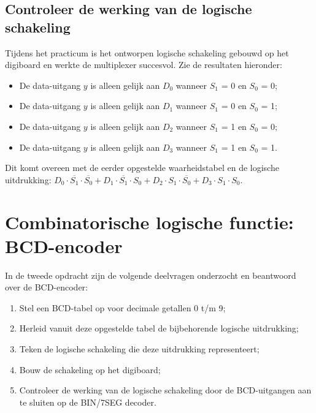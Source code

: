 \documentclass[12pt]{article}
\begin{document}
\subsection{Controleer de werking van de logische schakeling}
Tijdens het practicum is het ontworpen logische schakeling gebouwd op het digiboard en werkte de multiplexer succesvol. 
Zie de resultaten hieronder: 
\begin{itemize}
    \item De data-uitgang $y$ is alleen gelijk aan $D_0$ wanneer $S_1$ = 0 en $S_0$ = 0;
    \item De data-uitgang $y$ is alleen gelijk aan $D_1$ wanneer $S_1$ = 0 en $S_0$ = 1;
    \item De data-uitgang $y$ is alleen gelijk aan $D_2$ wanneer $S_1$ = 1 en $S_0$ = 0;
    \item De data-uitgang $y$ is alleen gelijk aan $D_3$ wanneer $S_1$ = 1 en $S_0$ = 1.
\end{itemize}
Dit komt overeen met de eerder opgestelde waarheidstabel en de logische uitdrukking: $D_0 \cdot \overline{S_1} \cdot \overline{S_0} + D_1 \cdot \overline{S_1} \cdot S_0 + D_2 \cdot S_1 \cdot \overline{S_0} + D_3 \cdot S_1 \cdot S_0$.
\pagebreak
\section{Combinatorische logische functie: BCD-encoder}
In de tweede opdracht zijn de volgende deelvragen onderzocht en beantwoord over de BCD-encoder:
\begin{enumerate}
    \item Stel een BCD-tabel op voor decimale getallen 0 t/m 9;
    \item Herleid vanuit deze opgestelde tabel de bijbehorende logische uitdrukking;
    \item Teken de logische schakeling die deze uitdrukking representeert;
    \item Bouw de schakeling op het digiboard;
    \item Controleer de werking van de logische schakeling door de BCD-uitgangen aan te sluiten op de BIN/7SEG decoder. 
\end{enumerate}
\pagebreak
\end{document}
